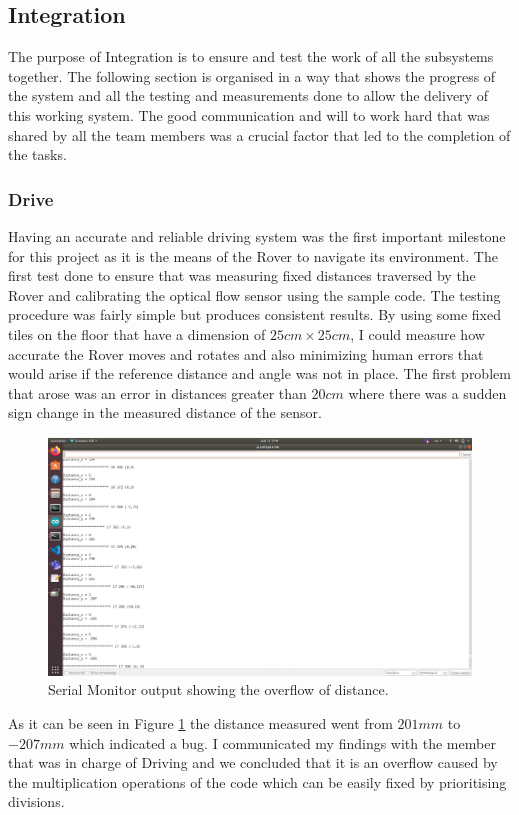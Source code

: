 \documentclass[a4paper]{article}
\begin{document}
\subsection{Integration}
The purpose of Integration is to ensure and test the work of all the subsystems together. The following section is organised in a 
way that shows the progress of the system and all the testing and measurements done to allow the delivery of this working system. 
The good communication and will to work hard that was shared by all the team members was a crucial factor that led to the completion of the tasks.

\subsubsection{Drive}
Having an accurate and reliable driving system was the first important milestone for this project as it is the means of the Rover to navigate its environment.
The first test done to ensure that was measuring fixed distances traversed by the Rover and calibrating the optical flow sensor using the sample code. The testing procedure was fairly simple but produces consistent results.
By using some fixed tiles on the floor that have a dimension of \(25cm\times 25cm\), I could measure how accurate the Rover moves and rotates and also minimizing human errors that would arise if the reference distance and angle was not in place. 
The first problem that arose was an error in distances greater than \(20cm\) where there was a sudden sign change  in the measured distance of the sensor.
\begin{figure}[H]
    \centering
    \includegraphics[scale=0.3]{./images/overflow_example.png}
    \caption{Serial Monitor output showing the overflow of distance.}
    \label{image:Overflow of Distance}
 \end{figure}
As it can be seen in Figure \ref{image:Overflow of Distance} the distance measured went from \(201mm\) to \(-207mm\) which indicated a bug. I communicated my findings with the member that 
was in charge of Driving and we concluded that it is an overflow caused by the multiplication operations of the code which can be easily fixed by prioritising divisions.
\end{document}
